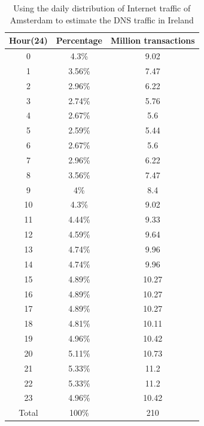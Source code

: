\documentclass[conference]{IEEEtran}
\begin{document}
\begin{table}[hbt!]
    \centering
    \begin{tabular}{|c|c|c|}
        \hline
         Hour(24) & Percentage & Million transactions\\
        \hline
        0 & 4.3\% & 9.02 \\
        \hline
        1 & 3.56\% & 7.47 \\
        \hline
        2 & 2.96\% & 6.22 \\
        \hline
        3 & 2.74\% & 5.76 \\
        \hline
        4 & 2.67\% & 5.6 \\
        \hline
        5 & 2.59\% & 5.44 \\
        \hline
        6 & 2.67\% & 5.6  \\
        \hline
        7 & 2.96\% & 6.22  \\
        \hline
        8 & 3.56\% & 7.47  \\
        \hline
        9 & 4\% & 8.4  \\
        \hline
        10 & 4.3\% & 9.02  \\
        \hline
        11 & 4.44\% & 9.33 \\
        \hline
        12 & 4.59\% & 9.64  \\
        \hline
        13 & 4.74\% & 9.96 \\
        \hline
        14 & 4.74\% & 9.96 \\
        \hline
        15 & 4.89\% & 10.27 \\
        \hline
        16 & 4.89\% & 10.27 \\
        \hline
        17 & 4.89\% & 10.27 \\
        \hline
        18 & 4.81\% & 10.11 \\
        \hline
        19 & 4.96\% & 10.42 \\
        \hline
        20 & 5.11\% & 10.73 \\
        \hline
        21 & 5.33\% & 11.2 \\
        \hline
        22 & 5.33\% & 11.2 \\
        \hline
        23 & 4.96\% & 10.42 \\
        \hline
        Total & 100\% & 210  \\
        \hline
    \end{tabular}
    \caption{Using the daily distribution of Internet traffic of Amsterdam to estimate the DNS traffic in Ireland \cite{Amsterdam_internet_traffic}}
    \label{tab:table_dns_Ireland}
\end{table}
\end{document}
